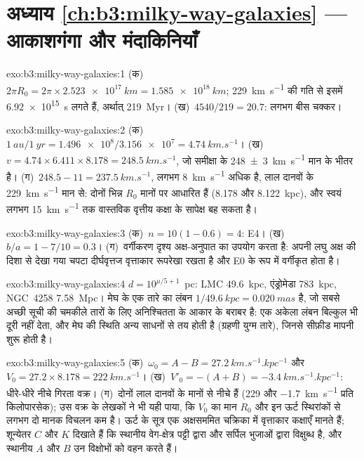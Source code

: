 \section*{अध्याय \ref{ch:b3:milky-way-galaxies} --- आकाशगंगा और मंदाकिनियाँ}

\begin{solution}{exo:b3:milky-way-galaxies:1}
(क)~$2\pi R_0 = 2\pi\times\qty{2.523e17}{km} = \qty{1.585e18}{km}$;
\qty{229}{km.s^{-1}} की गति से इसमें \qty{6.92e15}{s} लगते हैं, अर्थात्
\qty{219}{Myr}। (ख)~$4540/219 = 20.7$: लगभग बीस चक्कर।
\end{solution}

\begin{solution}{exo:b3:milky-way-galaxies:2}
(क)~$\qty{1}{au}/\qty{1}{yr} = \num{1.496e8}/\num{3.156e7} =
\qty{4.74}{km.s^{-1}}$। (ख)~$v = 4.74\times6.411\times8.178 =
\qty{248.5}{km.s^{-1}}$, जो समीक्षा के
\qty[separate-uncertainty=true]{248 \pm 3}{km.s^{-1}} मान के भीतर है। (ग)~$248.5 - 11 = \qty{237.5}{km.s^{-1}}$,
लगभग \qty{8}{km.s^{-1}} अधिक है, लाल दानवों के \qty{229}{km.s^{-1}} मान से:
दोनों भिन्न $R_0$ मानों पर आधारित हैं (8.178 और \qty{8.122}{kpc}),
और  स्वयं लगभग \qty{15}{km.s^{-1}} तक
वास्तविक वृत्तीय कक्षा के सापेक्ष बह सकता है।
\end{solution}

\begin{solution}{exo:b3:milky-way-galaxies:3}
(क)~$n = 10(1 - 0.6) = 4$: E4। (ख)~$b/a = 1 - 7/10 = 0.3$। (ग)~वर्गीकरण
दृश्य अक्ष-अनुपात का उपयोग करता है: अपनी लघु अक्ष की दिशा से देखा गया चपटा दीर्घवृत्तज
वृत्ताकार रूपरेखा रखता है और E0 के रूप में वर्गीकृत होता है।
\end{solution}

\begin{solution}{exo:b3:milky-way-galaxies:4}
$d = 10^{\mu/5 + 1}$~pc: LMC \qty{49.6}{kpc}, एंड्रोमेडा
\qty{783}{kpc}, NGC~4258 \qty{7.58}{Mpc}। मेघ के एक तारे का
लंबन $1/\qty{49.6}{kpc} = \qty{0.020}{mas}$ है, जो सबसे अच्छी सूची की
चमकीले तारों के लिए अनिश्चितता के आकार के बराबर है: एक अकेला लंबन
बिल्कुल भी दूरी नहीं देता, और मेघ की स्थिति अन्य साधनों से तय होती है
(ग्रहणी युग्म तारे), जिनसे सीफ़ीड मापनी शुरू होती है।
\end{solution}

\begin{solution}{exo:b3:milky-way-galaxies:5}
(क)~$\omega_0 = A - B = \qty{27.2}{km.s^{-1}.kpc^{-1}}$ और $V_0 =
27.2\times8.178 = \qty{222}{km.s^{-1}}$। (ख)~$V'_0 = -(A + B) =
\qty{-3.4}{km.s^{-1}.kpc^{-1}}$: धीरे-धीरे नीचे गिरता वक्र। (ग)~दोनों
लाल दानवों के मानों से नीचे हैं (229 और \qty{-1.7}{km.s^{-1}}
प्रति किलोपारसेक); उस वक्र के लेखकों ने भी यही पाया, कि $V_0$ का मान
$R_0$ और इन ऊर्ट स्थिरांकों से लगभग दो मानक विचलन कम है।
ऊर्ट के सूत्र एक अक्षसममित चक्रिका में वृत्ताकार कक्षाएँ मानते हैं; शून्येतर $C$ और
$K$ दिखाते हैं कि स्थानीय वेग-क्षेत्र पट्टी द्वारा
और सर्पिल भुजाओं द्वारा विक्षुब्ध है, और स्थानीय $A$ और $B$ उन विक्षोभों को वहन करते हैं।
\end{solution}

